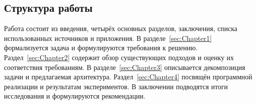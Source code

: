 \subsection{Структура работы}

Работа состоит из введения, четырёх основных разделов, заключения, списка
использованных источников и приложения. В разделе~\ref{sec:Chapter1}
формализуется задача и формулируются требования к решению.
Раздел~\ref{sec:Chapter2} содержит обзор существующих подходов и оценку их
соответствия требованиям. В разделе~\ref{sec:Chapter3} описывается декомпозиция
задачи и предлагаемая архитектура. Раздел~\ref{sec:Chapter4} посвящён
программной реализации и результатам экспериментов. В заключении подводятся
итоги исследования и формулируются рекомендации.
